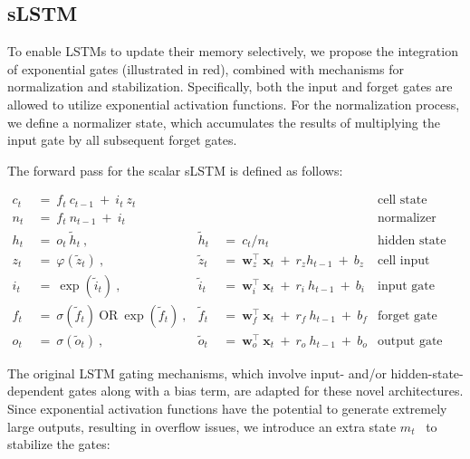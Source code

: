 \subsection{sLSTM}
\label{sec:sLSTM}

To enable LSTMs to update their memory selectively, we propose the integration of exponential gates (illustrated in red), combined with mechanisms for normalization and stabilization. Specifically, both the input and forget gates are allowed to utilize exponential activation functions. For the normalization process, we define a normalizer state, which accumulates the results of multiplying the input gate by all subsequent forget gates. 

The forward pass for the scalar sLSTM is defined as follows:

\begin{align}
\label{eq:slstmforward}
c_t \ &= \  f_t \ c_{t-1} \ + \ i_t \ z_t & & 
 &\text{cell state} \\
n_t \ &= \  f_t \ n_{t-1} \ + \ i_t  & & 
 &\text{normalizer state} \\
h_t \ &= \ o_t \ \tilde{h}_t \ ,
  &\tilde{h}_t \ &= \ c_t / n_t
&\text{hidden state} \\
z_t \ &= \ \varphi \left( \tilde{z}_t \right) \ , 
  &\tilde{z}_t \ &=  \ \mathbf{w}^\top_{z} \ \mathbf{x}_t \ + \
  r_{z}  h_{t-1} \ + \  b_{z}
  &\text{cell input} \\
i_t \ &= \ \!\exp \left( \tilde{i}_t  \right) \ , 
  &\tilde{i}_t \ &= \ \mathbf{w}^\top_{i} \ \mathbf{x}_t \ + \
  r_{i}  \ h_{t-1} \ + \  b_{i}
  &\text{input gate} \\
f_t \ &= \ \sigma \left(  \tilde{f}_t \right) \ \text{OR} \
\!\exp \left(  \tilde{f}_t \right) \ ,
  &\tilde{f}_t \ &= \ \mathbf{w}^\top_{f} \ \mathbf{x}_t  \ + \
  r_{f}  \ h_{t-1} \ + \  b_{f}
  &\text{forget gate} \\
o_t \ &= \ \sigma \left( \tilde{o}_t \right) \ , 
  &\tilde{o}_t  \ &= \ \mathbf{w}^\top_{o} \ \mathbf{x}_t \ + \
  r_{o}  \ h_{t-1} \ + \  b_{o}
  &\text{output gate} 
\end{align}

The original LSTM gating mechanisms, which involve input- and/or hidden-state-dependent gates along with a bias term, are adapted for these novel architectures. Since exponential activation functions have the potential to generate extremely large outputs, resulting in overflow issues, we introduce an extra state \mbox{$m_t$~\citep{Milakov:18arxiv}} to stabilize the gates:

